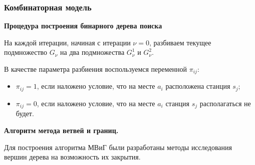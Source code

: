 \begin{frame}
    \frametitle{Комбинаторная модель}
    \justifying
    \begin{minipage}[t]{1\linewidth}
        \fontsize{8pt}{7.2}\selectfont
        \textbf{Процедура построения бинарного дерева поиска} 
        \bigskip

        На каждой итерации, начиная с итерации $\nu=0$, разбиваем текущее подмножество $G_\nu$ на два подмножества $G^1_\nu$ и $G^2_\nu$. 
    \bigskip
    \end{minipage}
    
    \begin{minipage}[b]{0.5\linewidth}
        \fontsize{8pt}{7.2}\selectfont
        В качестве параметра разбиения воспользуемся переменной $\pi_{ij}$:

        \begin{itemize}
            \item $\pi_{ij}=1$, если наложено условие, что на месте $a_i$ расположена станция $s_j$;
            \item $\pi_{ij} = 0$, если наложено условие, что на месте $a_i$ станция $s_j$  располагаться не будет.
        \end{itemize}
        \bigskip

    \end{minipage}
    \hfill
    \begin{minipage}[b]{0.47\linewidth}
        
    \end{minipage}
    \hfill
    \begin{minipage}[b]{1\linewidth}
        \fontsize{8pt}{7.2}\selectfont
        \textbf{Алгоритм метода ветвей и границ.}
        \bigskip

        Для построения алгоритма МВиГ были разработаны методы исследования вершин дерева на возможность их закрытия.
        \bigskip

    \end{minipage}

\end{frame}


